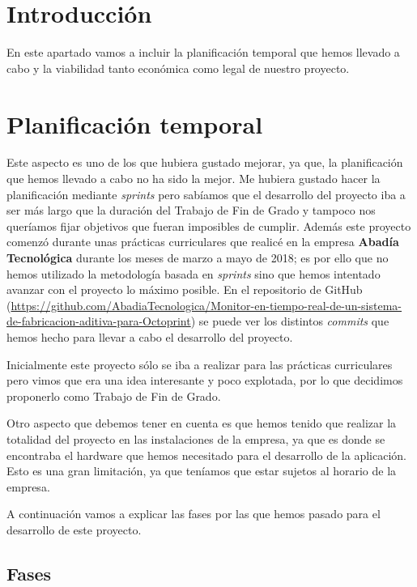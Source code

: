 
\section{Introducción}

En este apartado vamos a incluir la planificación temporal que hemos llevado a cabo y la viabilidad tanto económica como legal de nuestro proyecto.

\section{Planificación temporal}

Este aspecto es uno de los que hubiera gustado mejorar, ya que, la planificación que hemos llevado a cabo no ha sido la mejor. Me hubiera gustado hacer la planificación mediante \textit{sprints} pero sabíamos que el desarrollo del proyecto iba a ser más largo que la duración del Trabajo de Fin de Grado y tampoco nos queríamos fijar objetivos que fueran imposibles de cumplir. Además este proyecto comenzó durante unas prácticas curriculares que realicé en la empresa \textbf{Abadía Tecnológica} durante los meses de marzo a mayo de 2018; es por ello que no hemos utilizado la metodología basada en \textit{sprints} sino que hemos intentado avanzar con el proyecto lo máximo posible. En el repositorio de GitHub (\url{https://github.com/AbadiaTecnologica/Monitor-en-tiempo-real-de-un-sistema-de-fabricacion-aditiva-para-Octoprint}) se puede ver los distintos \textit{commits} que hemos hecho para llevar a cabo el desarrollo del proyecto. 

Inicialmente este proyecto sólo se iba a realizar para las prácticas curriculares pero vimos que era una idea interesante y poco explotada, por lo que decidimos proponerlo como Trabajo de Fin de Grado.

Otro aspecto que debemos tener en cuenta es que hemos tenido que realizar la totalidad del proyecto en las instalaciones de la empresa, ya que es donde se encontraba el hardware que hemos necesitado para el desarrollo de la aplicación. Esto es una gran limitación, ya que teníamos que estar sujetos al horario de la empresa.

A continuación vamos a explicar las fases por las que hemos pasado para el desarrollo de este proyecto.

\subsection{Fases}

